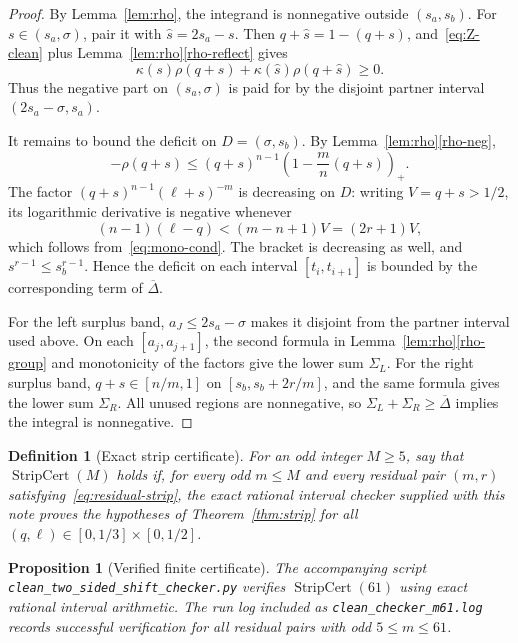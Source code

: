 \documentclass[11pt]{article}
\newtheorem{proposition}[theorem]{Proposition}
\newtheorem{definition}[theorem]{Definition}
\begin{document}
\begin{proof}
By Lemma~\ref{lem:rho}, the integrand is nonnegative outside $(s_a,s_b)$.  For $s\in(s_a,\sigma)$, pair it with $\widehat s=2s_a-s$.  Then $q+\widehat s=1-(q+s)$, and~\eqref{eq:Z-clean} plus Lemma~\ref{lem:rho}\ref{rho-reflect} gives
\[
        \kappa(s)\rho(q+s)+\kappa(\widehat s)\rho(q+\widehat s)\ge0.
\]
Thus the negative part on $(s_a,\sigma)$ is paid for by the disjoint partner interval $(2s_a-\sigma,s_a)$.

It remains to bound the deficit on $D=(\sigma,s_b)$.  By Lemma~\ref{lem:rho}\ref{rho-neg},
\[
        -\rho(q+s)\le(q+s)^{n-1}\left(1-\frac mn(q+s)\right)_+.
\]
The factor $(q+s)^{n-1}(\ell+s)^{-m}$ is decreasing on $D$: writing $V=q+s>1/2$, its logarithmic derivative is negative whenever
\[
        (n-1)(\ell-q)<(m-n+1)V=(2r+1)V,
\]
which follows from~\eqref{eq:mono-cond}.  The bracket is decreasing as well, and $s^{r-1}\le s_b^{r-1}$.  Hence the deficit on each interval $[t_i,t_{i+1}]$ is bounded by the corresponding term of $\overline\Delta$.

For the left surplus band, $a_J\le2s_a-\sigma$ makes it disjoint from the partner interval used above.  On each $[a_j,a_{j+1}]$, the second formula in Lemma~\ref{lem:rho}\ref{rho-group} and monotonicity of the factors give the lower sum $\Sigma_L$.  For the right surplus band, $q+s\in[n/m,1]$ on $[s_b,s_b+2r/m]$, and the same formula gives the lower sum $\Sigma_R$.  All unused regions are nonnegative, so $\Sigma_L+\Sigma_R\ge\overline\Delta$ implies the integral is nonnegative.
\end{proof}

\begin{definition}[Exact strip certificate]\label{def:cert}
For an odd integer $M\ge5$, say that $\operatorname{StripCert}(M)$ holds if, for every odd $m\le M$ and every residual pair $(m,r)$ satisfying~\eqref{eq:residual-strip}, the exact rational interval checker supplied with this note proves the hypotheses of Theorem~\ref{thm:strip} for all $(q,\ell)\in[0,1/3]\times[0,1/2]$.
\end{definition}

\begin{proposition}[Verified finite certificate]\label{prop:M61}
The accompanying script \texttt{clean\_two\_sided\_shift\_checker.py} verifies $\operatorname{StripCert}(61)$ using exact rational interval arithmetic.  The run log included as \texttt{clean\_checker\_m61.log} records successful verification for all residual pairs with odd $5\le m\le61$.
\end{proposition}
\end{document}
